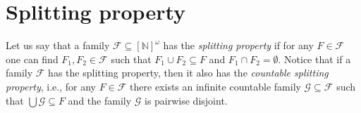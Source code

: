 \documentclass{amsart}
\theoremstyle{definition}
\theoremstyle{definition}
\newcommand{\N}{{\mathbb N}}
\newcommand{\InfSubs}{[\N]^{\omega}}
\begin{document}

\section*{Splitting property}



Let us say that a family $\mathcal{F} \subseteq \InfSubs$ has the \emph{splitting property} if 
for any $F \in \mathcal{F}$ one can find $F_1, F_2 \in \mathcal{F}$ such that $F_1 \cup F_2 \subseteq F$ and $F_1 \cap F_2 = \emptyset$. Notice that if a family $\mathcal{F}$ has the splitting property, then it also has the \emph{countable splitting property}, i.e., for any $F \in \mathcal{F}$ there exists an infinite countable family $\mathcal{G} \subseteq \mathcal{F}$ such that $\bigcup{\mathcal{G}} \subseteq F$ and the family $\mathcal{G}$ is pairwise disjoint.
\end{document}
